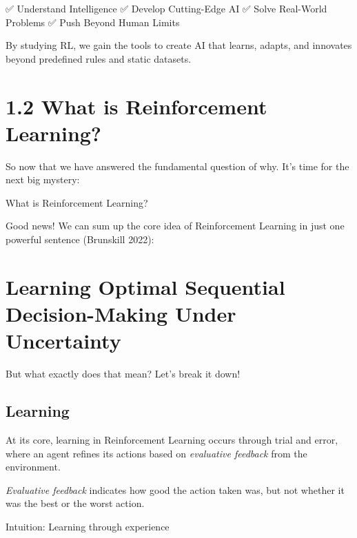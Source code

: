 \documentclass[
  letterpaper,
  DIV=11,
  numbers=noendperiod]{scrreprt}
\begin{document}
✅ Understand Intelligence ✅ Develop Cutting-Edge AI ✅ Solve
Real-World Problems ✅ Push Beyond Human Limits

By studying RL, we gain the tools to create AI that learns, adapts, and
innovates beyond predefined rules and static datasets. 🚀

\chapter{1.2 What is Reinforcement
Learning?}\label{what-is-reinforcement-learning}

\begin{tcolorbox}[enhanced jigsaw, arc=.35mm, toprule=.15mm, leftrule=.75mm, colback=white, left=2mm, colframe=quarto-callout-note-color-frame, rightrule=.15mm, opacityback=0, breakable, bottomrule=.15mm]

So now that we have answered the fundamental question of why. It's time
for the next big mystery:

What is Reinforcement Learning? 🤔

\end{tcolorbox}

Good news! We can sum up the core idea of Reinforcement Learning in just
one powerful sentence (Brunskill 2022):

\chapter{Learning Optimal Sequential Decision-Making Under
Uncertainty}\label{learning-optimal-sequential-decision-making-under-uncertainty}

But what exactly does that mean? Let's break it down!

\section{Learning}\label{learning}

At its core, learning in Reinforcement Learning occurs through trial and
error, where an agent refines its actions based on \emph{evaluative
feedback} from the environment.

\begin{tcolorbox}[enhanced jigsaw, toprule=.15mm, leftrule=.75mm, coltitle=black, left=2mm, opacityback=0, titlerule=0mm, arc=.35mm, toptitle=1mm, opacitybacktitle=0.6, bottomtitle=1mm, colframe=quarto-callout-tip-color-frame, title=\textcolor{quarto-callout-tip-color}{\faLightbulb}\hspace{0.5em}{Evaluative Feedback}, rightrule=.15mm, bottomrule=.15mm, colbacktitle=quarto-callout-tip-color!10!white, breakable, colback=white]

\emph{Evaluative feedback} indicates how good the action taken was, but
not whether it was the best or the worst action.

Intuition: Learning through experience

\end{tcolorbox}
\end{document}
